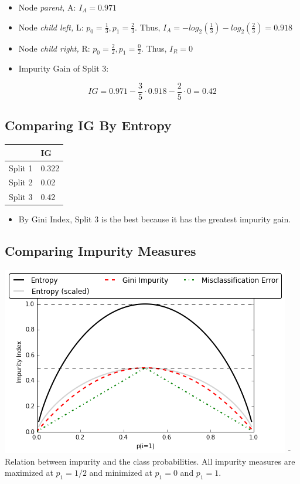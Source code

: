 \documentclass[
]{article}
\providecommand{\tightlist}{%
  \setlength{\itemsep}{0pt}\setlength{\parskip}{0pt}}
\begin{document}
\begin{itemize}
\item
  Node \emph{parent,} A: \(I_{A} = 0.971\)
\item
  Node \emph{child left,} L: \(p_0 = \frac{1}{3}, p_1 = \frac{2}{3}\).
  Thus, \(I_{A} = -log_2(\frac{1}{3}) -log_2(\frac{2}{3}) = 0.918\)
\item
  Node \emph{child right,} R: \(p_0 = \frac{2}{2}, p_1 = \frac{0}{2}\).
  Thus, \(I_{R} = 0\)
\item
  Impurity Gain of Split 3:
\end{itemize}

\[IG = 0.971 - \frac{3}{5} \cdot 0.918 - \frac{2}{5} \cdot 0 = 0.42\]

\hypertarget{comparing-ig-by-entropy}{%
\subsection{Comparing IG By Entropy}\label{comparing-ig-by-entropy}}

\begin{longtable}[]{@{}ll@{}}
\toprule
& IG \\
\midrule
\endhead
Split 1 & 0.322 \\
Split 2 & 0.02 \\
Split 3 & 0.42 \\
\bottomrule
\end{longtable}

\begin{itemize}
\tightlist
\item
  By Gini Index, Split 3 is the best because it has the greatest
  impurity gain.
\end{itemize}

\hypertarget{comparing-impurity-measures}{%
\subsection{Comparing Impurity
Measures}\label{comparing-impurity-measures}}

\includegraphics{images/i.png} - Relation between impurity and the class
probabilities. All impurity measures are maximized at
\textbf{\(p_1 =1/2\)} and minimized at \textbf{\(p_1 = 0\)} and
\textbf{\(p_1=1\)}.
\end{document}
